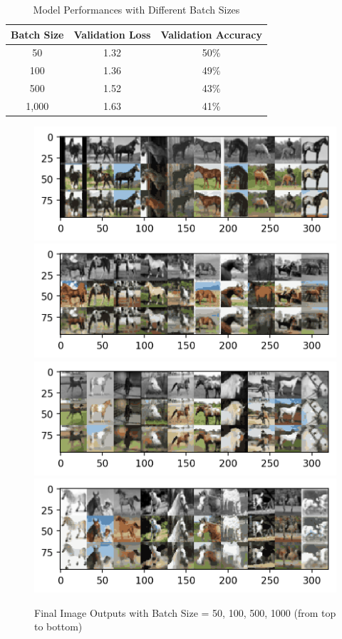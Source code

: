 \documentclass[12pt]{article}
\begin{document}
	\begin{table}[H]
		\centering
		\caption{Model Performances with Different Batch Sizes}
		\begin{tabular}{c|c c}
			\toprule
			Batch Size & Validation Loss & Validation Accuracy \\
			\midrule
			50 & 1.32 & 50\% \\
			100 & 1.36 & 49\% \\
			500 & 1.52 & 43\% \\
			1,000 & 1.63 & 41\% \\
			\bottomrule
		\end{tabular}
	\end{table}
	
	\begin{figure}[H]
		\centering
		\caption{Final Image Outputs with Batch Size = 50, 100, 500, 1000 (from top to bottom)}
		\includegraphics[width=\linewidth]{figures/unet_output_bs_50.png}
		\includegraphics[width=\linewidth]{figures/unet_output_bs_100.png}
		\includegraphics[width=\linewidth]{figures/unet_output_bs_500.png}
		\includegraphics[width=\linewidth]{figures/unet_output_bs_1000.png}
	\end{figure}
\end{document}
